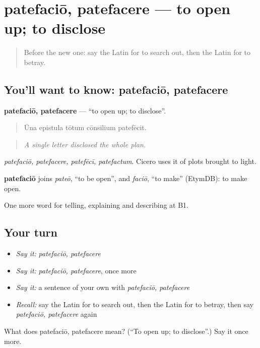 \section[patefaciō, patefacere]{patefaciō, patefacere — to open up; to disclose}

\label{lesson:LA-C302-patefacio}



\begin{quote}
Before the new one: say the Latin for to search out, then the Latin for to betray.
\end{quote}

\subsection*{You'll want to know: patefaciō, patefacere}
\textbf{patefaciō, patefacere} — \textquotedblleft{}to open up; to disclose\textquotedblright{}.

\begin{quote}
Ūna epistula tōtum cōnsilium patefēcit.
\end{quote}

\begin{quote}
\emph{A single letter disclosed the whole plan.}
\end{quote}

\emph{patefaciō, patefacere, patefēcī, patefactum}. Cicero uses it of plots brought to light.

\begin{cousinweb}
\textbf{patefaciō} joins \emph{pateō}, \textquotedblleft{}to be open\textquotedblright{}, and \emph{faciō}, \textquotedblleft{}to make\textquotedblright{} (EtymDB): to make open.
\end{cousinweb}

\begin{grammarlens}[title={What you've built}]
One more word for telling, explaining and describing at B1.
\end{grammarlens}

\subsection*{Your turn}
\begin{itemize}
\raggedright
  \item \emph{Say it:} \emph{patefaciō, patefacere}
  \item \emph{Say it:} \emph{patefaciō, patefacere}, once more
  \item \emph{Say it:} a sentence of your own with \emph{patefaciō, patefacere}
  \item \emph{Recall:} say the Latin for to search out, then the Latin for to betray, then say \emph{patefaciō, patefacere} again
\end{itemize}

\begin{tcolorbox}[breakable,colback=teal!4,colframe=teal!35!black,title={Before you move on}]
What does patefaciō, patefacere mean? (\textquotedblleft{}To open up; to disclose\textquotedblright{}.) Say it once more.
\end{tcolorbox}
